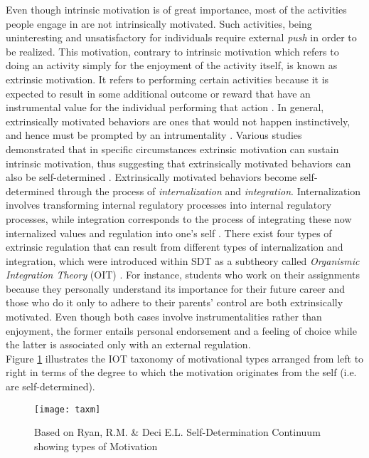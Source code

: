 Even though intrinsic motivation is of great importance, most of the activities people engage in are not intrinsically motivated. Such activities, being uninteresting and unsatisfactory for individuals  require external \textit{push} in order to be realized. This motivation, contrary to intrinsic motivation which refers to doing an activity simply for the enjoyment of the activity itself, is known as extrinsic motivation. It refers to performing certain activities because it is expected to result in some additional outcome or reward that have an instrumental value for the individual performing that action \cite{ryan2000self}. In general, extrinsically motivated behaviors are ones that would not happen instinctively, and hence must be prompted by an intrumentality \cite{deci1994promoting}. Various studies demonstrated that in specific circumstances extrinsic motivation can sustain intrinsic motivation, thus suggesting that extrinsically motivated behaviors can also be self-determined \cite{deci1994promoting}. Extrinsically motivated behaviors become self-determined through the process of \textit{internalization} and \textit{integration}. Internalization involves transforming internal regulatory processes into internal regulatory processes, while integration corresponds to the process of integrating these now internalized values and regulation into one's self \cite{deci1994promoting}. There exist four types of extrinsic regulation that can result from different types of internalization and integration, which were introduced within SDT as a subtheory called \textit{Organismic Integration Theory} (OIT) \cite{ryan2000intrinsic, ryan2000self, deci1994promoting}. For instance, students who work on their assignments because they personally understand its importance for their future career and those who do it only to adhere to their parents' control are both extrinsically motivated. Even though both cases involve instrumentalities rather than enjoyment, the former entails personal endorsement and a feeling of choice while the latter is associated only with an external regulation.\\
Figure \ref{fig:tax} illustrates the IOT taxonomy of motivational types arranged from left to right in terms of the degree to which the motivation originates from the self (i.e. are self-determined).\\ 
\begin{figure}[h]
    \centering
    \texttt{[image: taxm]}
    \caption{Based on Ryan, R.M. \& Deci E.L. Self-Determination Continuum showing types of Motivation}
    \label{fig:tax}
\end{figure}\\
